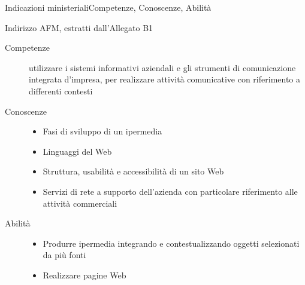 \documentclass[italian]{beamer}
\begin{document}
\begin{frame}{Indicazioni ministeriali}{Competenze, Conoscenze, Abilit\`a}
	\begin{block}{Indirizzo AFM, estratti dall'Allegato B1}
		
		\begin{description}
			\item[Competenze] utilizzare i sistemi informativi aziendali e gli strumenti di comunicazione integrata d'impresa, per realizzare attivit\`a
			comunicative con riferimento a differenti contesti
		\end{description}
		
		\begin{description}
			\item[Conoscenze]
			\begin{itemize}
				\item Fasi di sviluppo di un ipermedia
				\item \alert{Linguaggi del Web}
				\item Struttura, usabilit\`a e accessibilit\`a di un sito Web
				\item Servizi di rete a supporto dell'azienda con particolare riferimento alle attivit\`a commerciali 
			\end{itemize}
		\end{description}
		
		\begin{description}
			\item[Abilit\`a]
			\begin{itemize}
				\item Produrre ipermedia integrando e contestualizzando oggetti selezionati da pi\`u fonti
				\item \alert{Realizzare pagine Web}
			\end{itemize}
		\end{description}
		
	\end{block}
		
	\note{%

	}%
\end{frame}

		
		
\end{document}
